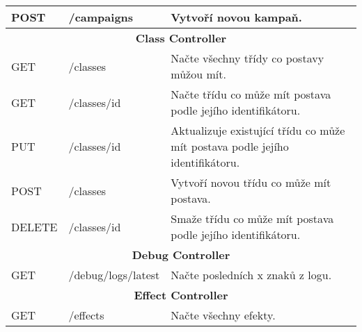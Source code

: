 \begin{longtable}{|l|l|p{}|}
    POST            & /campaigns                  & Vytvoří novou kampaň.                                                                                                                      \\
    \hline
    \multicolumn{3}{|c|}{\textbf{Class Controller}}                                                                                                                                            \\
    \hline
    GET             & /classes                    & Načte všechny třídy co postavy můžou mít.                                                                                                  \\
    GET             & /classes/{id}               & Načte třídu co může mít postava podle jejího identifikátoru.                                                                               \\
    PUT             & /classes/{id}               & Aktualizuje existující třídu co může mít postava podle jejího identifikátoru.                                                              \\
    POST            & /classes                    & Vytvoří novou třídu co může mít postava.                                                                                                   \\
    DELETE          & /classes/{id}               & Smaže třídu co může mít postava podle jejího identifikátoru.                                                                               \\
    \hline
    \multicolumn{3}{|c|}{\textbf{Debug Controller}}                                                                                                                                            \\
    \hline
    GET             & /debug/logs/latest          & Načte posledních x znaků z logu.                                                                                                           \\
    \hline
    \multicolumn{3}{|c|}{\textbf{Effect Controller}}                                                                                                                                           \\
    \hline
    GET             & /effects                    & Načte všechny efekty.                                                                                                                      \\

\end{longtable}
